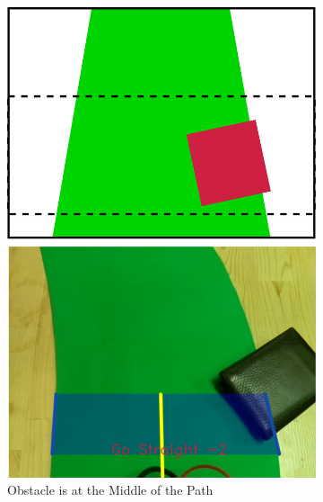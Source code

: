 \documentclass[a4paper,12pt]{article}
\begin{document}
\begin{figure}[H]
\begin{subfigure}{.31\textwidth}
\includegraphics[width=0.30\unitlength]{images/path_images/down_2}

\caption{\label{fig:dataP_down_2} Obstacle is at the Middle of the Path}

\end{subfigure}
\begin{subfigure}{.31\textwidth}

\centering


\end{subfigure}
\end{figure}
\end{document}
